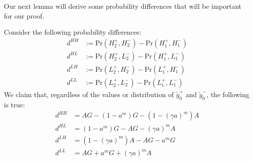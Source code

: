 Our next lemma will derive some probability differences that will be important for our proof.

\begin{lemma}
\label{lemma:lemma2}
Consider the following probability differences:
\begin{align}
d^{HH} &:= \textrm{Pr}(H_2^{+}, H_2^{-}) - \textrm{Pr}(H_1^{+}, H_1^{-})\\
d^{HL} &:= \textrm{Pr}(H_2^{+}, L_2^{-}) - \textrm{Pr}(H_1^{+}, L_1^{-})\\
d^{LH} &:= \textrm{Pr}(L_2^{+}, H_2^{-}) - \textrm{Pr}(L_1^{+}, H_1^{-})\\
d^{LL} &:= \textrm{Pr}(L_2^{+}, L_2^{-}) - \textrm{Pr}(L_1^{+}, L_1^{-})
\end{align}
We claim that, regardless of the values or distribution of $\tilde{y}_0^{+}$ and $\tilde{y}_0^{-}$, the following is true:
\begin{align}
d^{HH} &= AG - (1 - a^m) G - (1 - (\gamma a)^m) A\\
d^{HL} &= (1 - a^m) G - AG - (\gamma a)^m A\\
d^{LH} &=  (1 - (\gamma a)^m) A - AG - a^m G\\
d^{LL} &= AG + a^m G + (\gamma a)^m A
\end{align}
\end{lemma}

